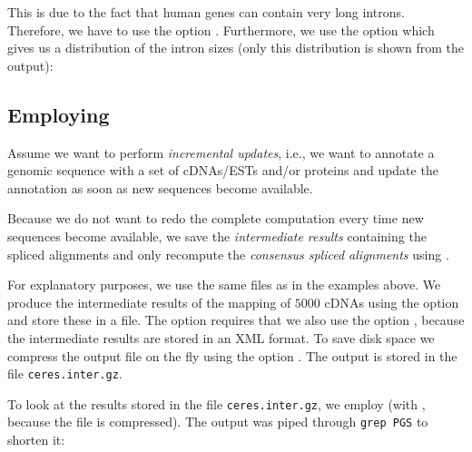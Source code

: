 \documentclass[11pt,a4paper,titlepage]{article}
\begin{document}

This is due to the fact that human genes can contain very long introns.
Therefore, we have to use the option .
Furthermore, we use the option  which gives us a distribution of the intron sizes (only this distribution is shown from the output):




\subsection{Employing \Callgthconsensus}
Assume we want to perform \emph{incremental updates}, i.e., we want to annotate
a genomic sequence with a set of cDNAs/ESTs and/or proteins and update the annotation as soon as new sequences become available.

Because we do not want to redo the complete computation every time new sequences become available, we save the \emph{intermediate results} containing the spliced alignments and only recompute the \emph{consensus spliced alignments} using \Callgthconsensus.

For explanatory purposes, we use the same files as in the examples above.
We produce the intermediate results of the mapping of $5000$ cDNAs using the
option  and store these in a file. The option
 requires that we also use the option
, because the intermediate results are stored in an XML
format. To save disk space we compress the output file on the fly using the
option . The output is stored in the file \texttt{ceres.inter.gz}.


To look at the results stored in the file \texttt{ceres.inter.gz}, we employ \Callgthconsensus (with , because the file is compressed).
The output was piped through \texttt{grep PGS} to shorten it:
\end{document}
